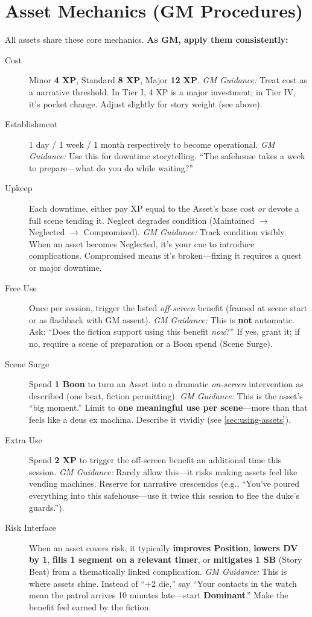 \section{Asset Mechanics (GM Procedures)}
\label{sec:asset-mechanics}
All assets share these core mechanics. \textbf{As GM, apply them consistently:}  
\begin{description}
  \item[Cost] Minor \textbf{4 XP}, Standard \textbf{8 XP}, Major \textbf{12 XP}.   
        \textit{GM Guidance:} Treat cost as a narrative threshold. In Tier I, 4 XP is a major investment; in Tier IV, it's pocket change. Adjust slightly for story weight (see above).  
  \item[Establishment] 1 day / 1 week / 1 month respectively to become operational.  
        \textit{GM Guidance:} Use this for downtime storytelling. ``The safehouse takes a week to prepare---what do you do while waiting?''  
  \item[Upkeep] Each downtime, either pay XP equal to the Asset's base cost \emph{or} devote a full scene tending it. Neglect degrades condition (Maintained $\rightarrow$ Neglected $\rightarrow$ Compromised).  
        \textit{GM Guidance:} Track condition visibly. When an asset becomes Neglected, it's your cue to introduce complications. Compromised means it's broken---fixing it requires a quest or major downtime.  
  \item[Free Use] Once per session, trigger the listed \emph{off-screen} benefit (framed at scene start or as flashback with GM assent).  
        \textit{GM Guidance:} This is \textbf{not} automatic. Ask: ``Does the fiction support using this benefit \emph{now}?'' If yes, grant it; if no, require a scene of preparation or a Boon spend (Scene Surge).  
  \item[Scene Surge] Spend \textbf{1 Boon} to turn an Asset into a dramatic \emph{on-screen} intervention as described (one beat, fiction permitting).  
        \textit{GM Guidance:} This is the asset's ``big moment.'' Limit to \textbf{one meaningful use per scene}---more than that feels like a deus ex machina. Describe it vividly (see \ref{sec:using-assets}).  
  \item[Extra Use] Spend \textbf{2 XP} to trigger the off-screen benefit an additional time this session.  
        \textit{GM Guidance:} Rarely allow this---it risks making assets feel like vending machines. Reserve for narrative crescendos (e.g., ``You've poured everything into this safehouse---use it twice this session to flee the duke's guards.'').  
  \item[Risk Interface] When an asset covers risk, it typically \textbf{improves Position}, \textbf{lowers DV by 1}, \textbf{fills 1 segment on a relevant timer}, or \textbf{mitigates 1 SB} (Story Beat) from a thematically linked complication.  
        \textit{GM Guidance:} This is where assets shine. Instead of ``+2 die,'' say ``Your contacts in the watch mean the patrol arrives 10 minutes late---start \textbf{Dominant}.'' Make the benefit feel earned by the fiction.  
\end{description}

